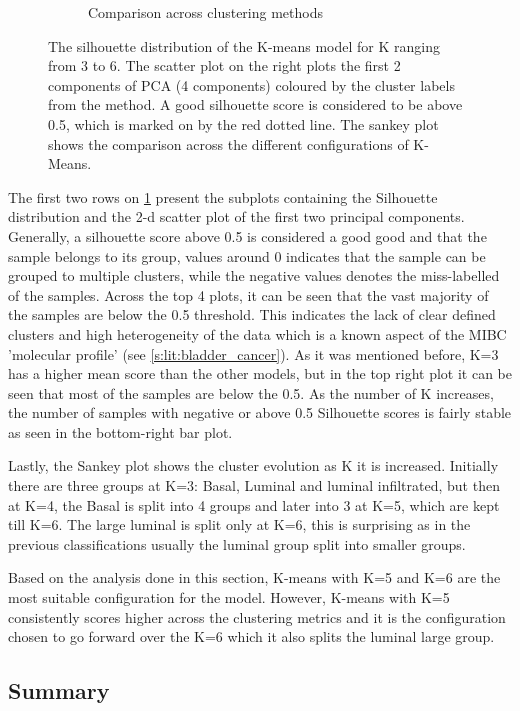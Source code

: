 \begin{figure}[!t]
\begin{subfigure}[!t]{0.49\textwidth}
        \caption{Comparison across clustering methods}
    \end{subfigure}
    \centering
    \caption{The silhouette distribution of the K-means model for K ranging from 3 to 6. The scatter plot on the right plots the first 2 components of PCA (4 components) coloured by the cluster labels from the method. A good silhouette score is considered to be above 0.5, which is marked on by the red dotted line. The sankey plot shows the comparison across the different configurations of K-Means.}
    \label{fig:cs:sill_distrib}
\end{figure}


The first two rows on \cref{fig:cs:sill_distrib} present the subplots containing the Silhouette distribution and the 2-d scatter plot of the first two principal components. Generally, a silhouette score above 0.5 is considered a good good and that the sample belongs to its group, values around 0 indicates that the sample can be grouped to multiple clusters, while the negative values denotes the miss-labelled of the samples. Across the top 4 plots, it can be seen that the vast majority of the samples are below the 0.5 threshold. This indicates the lack of clear defined clusters and high heterogeneity of the data which is a known aspect of the MIBC 'molecular profile' (see \cref{s:lit:bladder_cancer}). As it was mentioned before, K=3 has a higher mean score than the other models, but in the top right plot it can be seen that most of the samples are below the 0.5. As the number of K increases, the number of samples with negative or above 0.5 Silhouette scores is fairly stable as seen in the bottom-right bar plot. 

Lastly, the Sankey plot shows the cluster evolution as K it is increased. Initially there are three groups at K=3: Basal, Luminal and luminal infiltrated, but then at K=4, the Basal is split into 4 groups and later into 3 at K=5, which are kept till K=6. The large luminal is split only at K=6, this is surprising as in the previous classifications usually the luminal group split into smaller groups.

Based on the analysis done in this section, K-means with K=5 and K=6 are the most suitable configuration for the model. However, K-means with K=5 consistently scores higher across the clustering metrics and it is the configuration chosen to go forward over the K=6 which it also splits the luminal large group.

\subsection{Summary}

